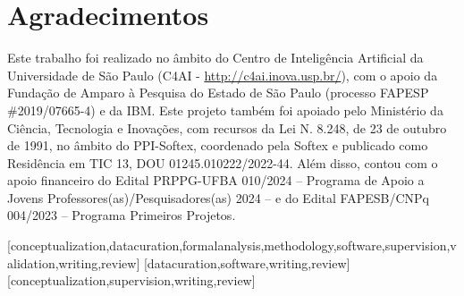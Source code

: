 \documentclass[portuguese]{textolivre}
\begin{document}
\begin{polyabstract}
\begin{english}
\begin{abstract}
  

\end{abstract}
\end{english}
\end{polyabstract}







\section{Agradecimentos}

Este trabalho foi realizado no âmbito do Centro de Inteligência
Artificial da Universidade de São Paulo (C4AI -
\url{http://c4ai.inova.usp.br/}), com o apoio da Fundação de Amparo à Pesquisa
do Estado de São Paulo (processo FAPESP \#2019/07665-4) e da IBM. Este
projeto também foi apoiado pelo Ministério da Ciência, Tecnologia e
Inovações, com recursos da Lei N. 8.248, de 23 de outubro de 1991, no
âmbito do PPI-Softex, coordenado pela Softex e publicado como Residência
em TIC 13, DOU 01245.010222/2022-44. Além disso, contou com o apoio
financeiro do Edital PRPPG-UFBA 010/2024 -- Programa de Apoio a Jovens
Professores(as)/Pesquisadores(as) 2024 -- e do Edital FAPESB/CNPq
004/2023 -- Programa Primeiros Projetos.



\printbibliography\label{sec-bib}
\begin{contributors}
[conceptualization,datacuration,formalanalysis,methodology,software,supervision,validation,writing,review]
[datacuration,software,writing,review]
[conceptualization,supervision,writing,review]
\end{contributors}
\end{document}
